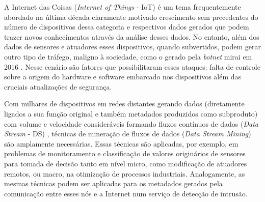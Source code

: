 

% 
% 


A Internet das Coisas (\emph{Internet of Things} - IoT) é um tema frequentemente
abordado na última década claramente motivado crescimento sem precedentes do
número de dispositivos dessa categoria e respectivos dados gerados que podem
trazer novos conhecimentos através da análise desses dados. No entanto, além dos
dados de sensores e atuadores esses dispositivos, quando subvertidos, podem
gerar outro tipo de tráfego, maligno à sociedade, como o gerado pela
\emph{botnet} mirai em 2016 \cite{Kambourakis2017}. Nesse cenário são fatores
que possibilitaram esses ataques: falta de controle sobre a origem do hardware e
software embarcado nos dispositivos além das cruciais atualizações de segurança.

Com milhares de dispositivos em redes distantes gerando dados (diretamente
ligados a sua função original e também metadados produzidos como subproduto) com
volume e velocidade consideráveis formando fluxos contínuos de dados (\emph{Data
Stream} - DS) , técnicas de mineração de fluxos de dados
(\emph{Data Stream Mining}) são amplamente necessárias. Essas técnicas são
aplicadas, por exemplo, em problemas de monitoramento e classificação de valores
originários de sensores para tomada de decisão tanto em nível micro, como
modificação de atuadores remotos, ou macro, na otimização de processos
industriais. Analogamente, as mesmas técnicas podem ser aplicadas para os
metadados gerados pela comunicação entre esses nós e a Internet num serviço de
detecção de intrusão.

